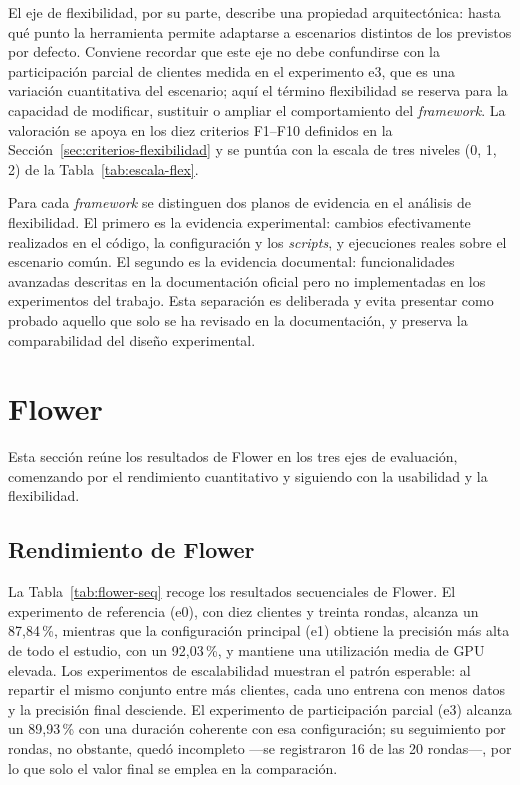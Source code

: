 El eje de flexibilidad, por su parte, describe una propiedad arquitectónica: hasta
qué punto la herramienta permite adaptarse a escenarios distintos de los previstos
por defecto. Conviene recordar que este eje no debe confundirse con la participación
parcial de clientes medida en el experimento e3, que es una variación cuantitativa
del escenario; aquí el término flexibilidad se reserva para la capacidad de
modificar, sustituir o ampliar el comportamiento del \textit{framework}. La
valoración se apoya en los diez criterios F1--F10 definidos en la Sección~\ref{sec:criterios-flexibilidad}
y se puntúa con la escala de tres niveles (0, 1, 2)
de la Tabla~\ref{tab:escala-flex}.

Para cada \textit{framework} se distinguen dos planos de evidencia en el análisis de
flexibilidad. El primero es la evidencia experimental: cambios efectivamente
realizados en el código, la configuración y los \textit{scripts}, y ejecuciones
reales sobre el escenario común. El segundo es la evidencia documental:
funcionalidades avanzadas descritas en la documentación oficial pero no implementadas
en los experimentos del trabajo. Esta separación es deliberada y evita presentar como
probado aquello que solo se ha revisado en la documentación, y preserva
la comparabilidad del diseño experimental.


\section{Flower}\label{sec:flower}

Esta sección reúne los resultados de Flower en los tres ejes de evaluación,
comenzando por el rendimiento cuantitativo y siguiendo con la usabilidad y la
flexibilidad.

\subsection{Rendimiento de Flower}\label{sec:resultados-flower}

La Tabla~\ref{tab:flower-seq} recoge los resultados secuenciales de Flower. El experimento de
referencia (e0), con diez clientes y treinta rondas, alcanza un 87{,}84\,\%, mientras que la
configuración principal (e1) obtiene la precisión más alta de todo el estudio, con un 92{,}03\,\%,
y mantiene una utilización media de GPU elevada. Los experimentos de escalabilidad muestran el
patrón esperable: al repartir el mismo conjunto entre más clientes, cada uno entrena con menos
datos y la precisión final desciende. El experimento de participación parcial (e3) alcanza un
89{,}93\,\% con una duración coherente con esa configuración; su seguimiento por rondas, no
obstante, quedó incompleto —se registraron 16 de las 20 rondas—, por lo que solo el valor final
se emplea en la comparación.

